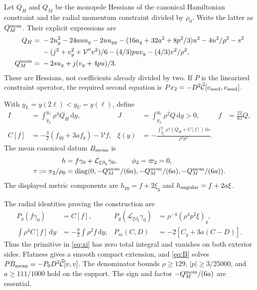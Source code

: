 \documentclass[11pt]{article}
\newcommand{\dd}{\mathrm d}
\newcommand{\Lie}{\mathcal L}
\begin{document}
Let $Q_H$ and $Q_M$ be the monopole Hessians of the canonical Hamiltonian
constraint and the radial momentum constraint divided by $\rho_0$.
Write the latter as $Q_M^{\rm mom}$. Their explicit expressions are
\begin{align}
 Q_H={}&-2u_y^2-24auu_y-2uu_{yy}
 -(16a_y+32a^2+8p^2/3)u^2-4u^2/\rho^2-s^2\nonumber\\
 &-(j^2+v_y^2+\mathcal V''v^2)/6
 -(4/3)puv_y-(4/3)v^2/\rho^2, \label{eq:sources}\\
 Q_M^{\rm mom}={}&-2s u_y+j(v_y+4pu)/3.\nonumber
\end{align}
These are Hessians, not coefficients already divided by two. If $P$ is
the linearized constraint operator, the required second equation is
$P x_2=-D^2\widehat{\mathcal C}[v_{\rm seed},v_{\rm seed}]$.

With $y_L=y(2\ell)<y_U=y(\ell)$, define
\begin{align}
 I&=\int_{y_L}^{y_U}\rho^4 Q_H\,\dd y,&
 J&=\int_{y_L}^{y_U}\rho^2 Q\,\dd y>0,& f&=\frac{2I}{9J}Q,
 \label{eq:IJ}\\
 C[f]&=-\tfrac32(f_{yy}+3af_y)-\mathcal V f,&
 \xi(y)&=-\frac{\displaystyle\int_{y_L}^{y}\rho^4(Q_H+C[f])\,\dd s}
                    {\rho^4p^2}.&&\label{eq:xi}
\end{align}
The mean canonical datum $B_{\rm mean}$ is
\begin{align}
 h&=f\gamma_0+\Lie_{\xi\partial_y}\gamma_0,\qquad
       \phi_2=\varpi_2=0,\nonumber\\
 \tau:=\pi_2/\rho_0&=\operatorname{diag}
       (0,-Q_M^{\rm mom}/(6a),-Q_M^{\rm mom}/(6a),-Q_M^{\rm mom}/(6a)).
       \label{eq:B}
\end{align}
The displayed metric components are $h_{yy}=f+2\xi_y$ and
$h_{\rm angular}=f+2a\xi$.

The radial identities proving the construction are
\begin{align}
 P_g(f\gamma_0)&=C[f],&
 P_g(\Lie_{\xi\partial_y}\gamma_0)&=\rho^{-4}(\rho^4p^2\xi)_y,
 \nonumber\\
 \int\rho^4 C[f]\,\dd y&=-\tfrac92\int\rho^2f\,\dd y,&
 P_m(C,D)&=-2[C_y+3a(C-D)]. \label{eq:rightinverse}
\end{align}
Thus the primitive in \eqref{eq:xi} has zero total integral and vanishes
on both exterior sides. Flatness gives a smooth compact extension, and
\eqref{eq:B} solves $P B_{\rm mean}=-P_0D^2\widehat{\mathcal C}[v,v]$.
The denominator bounds $\rho\ge129$, $|p|\ge3/25000$, and
$a\ge111/1000$ hold on the support. The sign and factor
$-Q_M^{\rm mom}/(6a)$ are essential.
\end{document}
